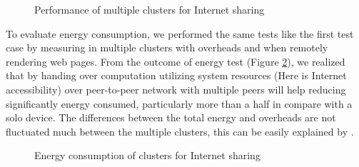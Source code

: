 \documentclass[conference]{IEEEtran}
\begin{document}
\begin{figure}[H]
	\hspace*{0cm}
	\caption{Performance of multiple clusters for Internet sharing}
	\label{fig:net_clusters_perf}
\end{figure}

To evaluate energy consumption, we performed the same tests like the first test case by measuring in multiple clusters with overheads and when remotely rendering web pages. From the outcome of energy test (Figure \ref{fig:net_cluster_energy}), we realized that by handing over computation utilizing system resources (Here is Internet accessibility) over peer-to-peer network with multiple peers will help reducing significantly energy consumed, particularly more than a half in compare with a solo device. The differences between the total energy and overheads are not fluctuated much between the multiple clusters, this can be easily explained by \cite{wifi_energy}.

\begin{figure}[H]
	\hspace*{0cm}
	\caption{Energy consumption of clusters for Internet sharing}
	\label{fig:net_cluster_energy}
\end{figure}
\end{document}
